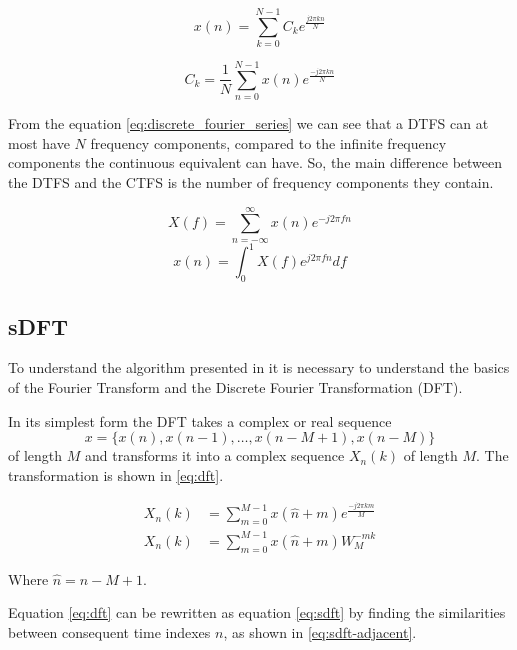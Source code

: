 \documentclass[../main.tex]{subfiles}
\begin{document}
\begin{equation}
    \label{eq:discrete_fourier_series}
    x(n) = \sum_{k=0}^{N-1} C_k e^{\frac{j 2 \pi k n}{N}}
\end{equation}

\begin{equation}
    \label{eq:discrete_fourier_series_coeff}
    C_k = \frac{1}{N} \sum_{n=0}^{N-1} x(n) e^{\frac{- j 2 \pi k n}{N}}
\end{equation}

From the equation \eqref{eq:discrete_fourier_series} we can see that a DTFS can at most have $N$ frequency components, compared to the infinite frequency components the continuous equivalent can have.
So, the main difference between the DTFS and the CTFS is the number of frequency components they contain.

\begin{equation}
    \label{eq:discrete_fourier_transform}
    X(f) = \sum_{n=-\infty}^{\infty} x(n) e^{-j 2 \pi f n}
\end{equation}
\begin{equation}
    \label{eq:inverse_discrete_fourier_transform}
    x(n) = \int_{0}^{1} X(f) e^{j 2 \pi f n} df
\end{equation}

\subsection{sDFT}%
\label{sub:sdft}

To understand the algorithm presented in \cite{osdft} it is necessary to understand the basics of the Fourier Transform and the Discrete Fourier Transformation (DFT).

In its simplest form the DFT takes a complex or real sequence $$x = \{x(n), x(n-1), \ldots, x(n-M+1), x(n-M)\}$$ of length $M$ and transforms it into a complex sequence $X_n(k)$ of length $M$. The transformation is shown in \eqref{eq:dft}.
  
\begin{equation}
    \label{eq:dft}
    \begin{split}
        X_n(k) &= \sum_{m=0}^{M-1} x(\hat{n}+m) e^{\frac{-j 2 \pi k m}{M}} \\
        X_n(k) &= \sum_{m=0}^{M-1} x(\hat{n}+m)W_M^{-mk}
    \end{split}
\end{equation}

Where $\hat{n} = n - M + 1$.

Equation \eqref{eq:dft} can be rewritten as equation \eqref{eq:sdft} by finding the similarities between consequent time indexes $n$, as shown in \eqref{eq:sdft-adjacent}.
\end{document}
